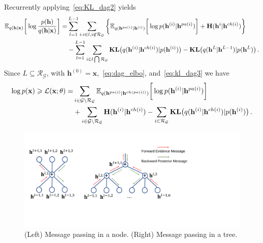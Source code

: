 \documentclass{article} %
\begin{document}
Recurrently applying~\eqref{eq:KL_dag2} yields
\begin{align} \label{eq:kl_dag3}
 \mathbb{E}_{q(\mathbf{h} | \mathbf{x})} \bigg[ \log  \frac{p( \mathbf{h})}{q(\mathbf{h}|\mathbf{x})}  \bigg] =& \sum_{l=1}^{L-1}   \sum_{i:i\in l, i \not\in   \mathcal{R}_{ \mathcal{G}}  }  \bigg\{ \mathbb{E}_{q(\mathbf{h}^{pa(i)}|\mathbf{h}^{(i)})} \bigg[ \log p( \mathbf{h}^{(i)}|  \mathbf{h}^{pa(i)})   \bigg]  +    \textbf{\text{H}}(\mathbf{h}^i | \mathbf{h}^{ch(i)} )  \bigg\} \\ \notag
& -   \sum_{l=1}^{L-1}  \sum_{i \in l \bigcap \mathcal{R}_{ \mathcal{G} }  }  \textbf{\text{KL}}\big(q(\mathbf{h}^{(i)} | \mathbf{h}^{ch(i)} )   | p(\mathbf{h}^{(i)})  \big)   -   \textbf{\text{KL}}\big(q(\mathbf{h}^L | \mathbf{h}^{L-1} )   | p(\mathbf{h}^L)  \big) \, .
 \end{align}
Since $L  \subseteq   \mathcal{R}_{ \mathcal{G}} $,  with $\mathbf{h}^{(0)} = \mathbf{x}$,~\eqref{eq:dag_elbo}, and~\eqref{eq:kl_dag3} we have 
\begin{align*}  
 \log p(\mathbf{x}) \geqslant  \mathcal{L}(\mathbf{x}; \theta) =&   \sum_{i \in \mathcal{G}  \setminus  \mathcal{R}_{ \mathcal{G} }  }  \mathbb{E}_{q(\mathbf{h}^{pa(i)}|\mathbf{h}^{ch(pa(i))})} \bigg[ \log p( \mathbf{h}^{(i)}|  \mathbf{h}^{pa(i)})   \bigg]  \\
 & +  \sum_{i \in \mathcal{G}  \setminus  \mathcal{R}_{ \mathcal{G} }  } \textbf{\text{H}}(\mathbf{h}^{(i)} | \mathbf{h}^{ch(i)} )   -    \sum_{i \in  \mathcal{R}_{ \mathcal{G} }  }  \textbf{\text{KL}}\big(q(\mathbf{h}^{(i)} | \mathbf{h}^{ch(i)} )   | p(\mathbf{h}^{(i)})  \big)  \, .
 \end{align*}


\begin{figure}[!htbp]%
\begin{center}
 \includegraphics[width=0.7\linewidth]{fig/message_pass.pdf}
\end{center}
  \caption{(Left) Message passing in a node. (Right) Message passing in a tree.} 
\label{fig:message}
\end{figure}
\end{document}

